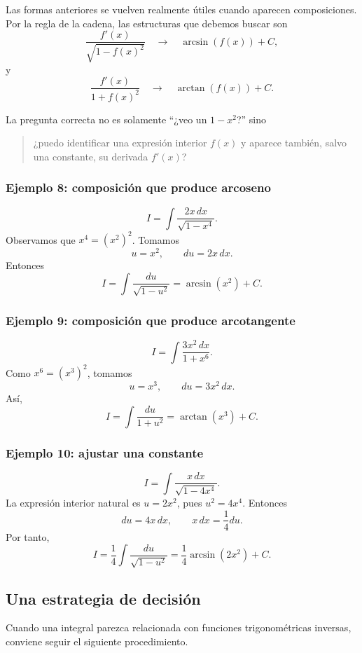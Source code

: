 \documentclass[12pt]{article}
\theoremstyle{definition}
\theoremstyle{remark}
\begin{document}
Las formas anteriores se vuelven realmente útiles cuando aparecen
composiciones. Por la regla de la cadena, las estructuras que debemos buscar
son
\[
\boxed{\frac{f'(x)}{\sqrt{1-f(x)^2}}}
\quad\longrightarrow\quad
\arcsin(f(x))+C,
\]
y
\[
\boxed{\frac{f'(x)}{1+f(x)^2}}
\quad\longrightarrow\quad
\arctan(f(x))+C.
\]

La pregunta correcta no es solamente ``¿veo un $1-x^2$?'' sino
\begin{quote}
¿puedo identificar una expresión interior $f(x)$ y aparece también, salvo una
constante, su derivada $f'(x)$?
\end{quote}

\subsubsection*{Ejemplo 8: composición que produce arcoseno}
\[
I=\int\frac{2x\,dx}{\sqrt{1-x^4}}.
\]
Observamos que $x^4=(x^2)^2$. Tomamos
\[
u=x^2,\qquad du=2x\,dx.
\]
Entonces
\[
I=\int\frac{du}{\sqrt{1-u^2}}
=\boxed{\arcsin(x^2)+C}.
\]

\subsubsection*{Ejemplo 9: composición que produce arcotangente}
\[
I=\int\frac{3x^2\,dx}{1+x^6}.
\]
Como $x^6=(x^3)^2$, tomamos
\[
u=x^3,\qquad du=3x^2\,dx.
\]
Así,
\[
I=\int\frac{du}{1+u^2}
=\boxed{\arctan(x^3)+C}.
\]

\subsubsection*{Ejemplo 10: ajustar una constante}
\[
I=\int\frac{x\,dx}{\sqrt{1-4x^4}}.
\]
La expresión interior natural es $u=2x^2$, pues $u^2=4x^4$. Entonces
\[
du=4x\,dx,
\qquad x\,dx=\frac14du.
\]
Por tanto,
\[
I=\frac14\int\frac{du}{\sqrt{1-u^2}}
=\boxed{\frac14\arcsin(2x^2)+C}.
\]

\subsection*{Una estrategia de decisión}

Cuando una integral parezca relacionada con funciones trigonométricas
inversas, conviene seguir el siguiente procedimiento.
\end{document}
